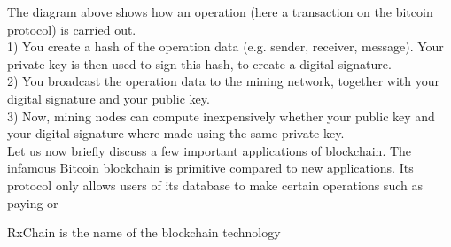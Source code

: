 The diagram above shows how an operation (here a transaction on the bitcoin protocol) is carried out.\\
1) You create a hash of the operation data (e.g. sender, receiver, message). Your private key is then used to sign this hash,
to create a digital signature.\\
2) You broadcast the operation data to the mining network, together with your digital signature and your public key.\\
3) Now, mining nodes can compute inexpensively whether your public key and your digital signature where made using the same private key.\\





Let us now briefly discuss a few important applications of blockchain.
The infamous Bitcoin blockchain is primitive compared to new applications.
Its protocol only allows users of its database to make certain operations such as paying or 


RxChain is the name of the blockchain technology
